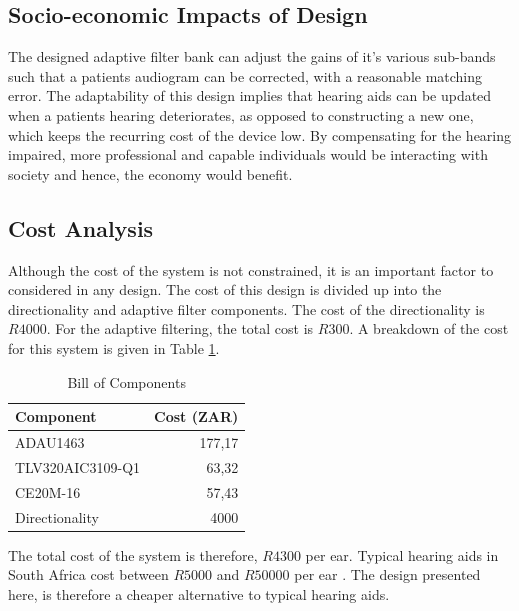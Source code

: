 \documentclass[11pt,onecolumn]{witseiepaper}
\begin{document}
\subsection{Socio-economic Impacts of Design}
\label{sec:socioImpacts}

\noindent The designed adaptive filter bank can adjust the gains of it's various sub-bands such that a patients audiogram can be corrected, with a reasonable matching error. The adaptability of this design implies that hearing aids can be updated when a patients hearing deteriorates, as opposed to constructing a new one, which keeps the recurring cost of the device low. By compensating for the hearing impaired, more professional and capable individuals would be interacting with society and hence, the economy would benefit.

\subsection{Cost Analysis}

\noindent Although the cost of the system is not constrained, it is an important factor to considered in any design. The cost of this design is divided up into the directionality and adaptive filter components. The cost of the directionality is $R4000$. For the adaptive filtering, the total cost is $R300$. A breakdown of the cost for this system is given in Table \ref{tab:bill}.

\begin{table}[htbp]
  \centering
  \caption{Bill of Components}
    \begin{tabular}{|l|r|}
    \hline
    \textbf{Component} & \multicolumn{1}{l|}{\textbf{Cost (ZAR)}} \\
    \hline
    ADAU1463 & 177,17 \\
    \hline
    TLV320AIC3109-Q1 & 63,32 \\
    \hline
    CE20M-16 & 57,43 \\
    \hline
    Directionality &  4000\\
    \hline
    \end{tabular}%
  \label{tab:bill}%
\end{table}%

\noindent The total cost of the system is therefore, $R4300$ per ear. Typical hearing aids in South Africa cost between $R5000$ and $R50000$ per ear \cite{cost}. The design presented here, is therefore a cheaper alternative to typical hearing aids.
\end{document}
